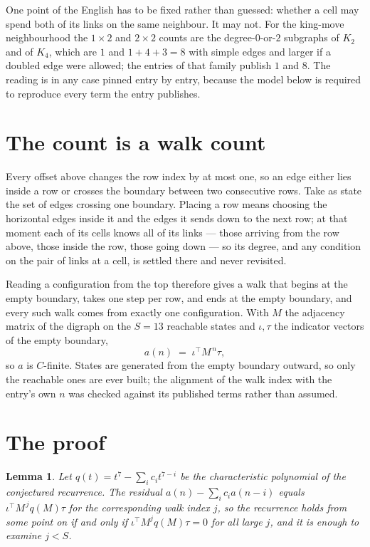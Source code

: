\documentclass[11pt,a4paper]{article}
\theoremstyle{plain}
\newtheorem{lemma}[theorem]{Lemma}
\theoremstyle{definition}
\begin{document}
One point of the English has to be fixed rather than guessed: whether a cell may spend both of
its links on the same neighbour. It may not. For the king-move neighbourhood the $1\times2$
and $2\times2$ counts are the degree-$0$-or-$2$ subgraphs of $K_2$ and of $K_4$, which are $1$
and $1+4+3=8$ with simple edges and larger if a doubled edge were allowed; the entries of that
family publish $1$ and $8$. The reading is in any case pinned entry by entry, because the
model below is required to reproduce every term the entry publishes.


\section{The count is a walk count}

Every offset above changes the row index by at most one, so an edge either lies inside a row
or crosses the boundary between two consecutive rows. Take as state the set of edges crossing
one boundary. Placing a row means choosing the horizontal edges inside it and the edges it
sends down to the next row; at that moment each of its cells knows all of its links --- those
arriving from the row above, those inside the row, those going down --- so its degree, and any
condition on the pair of links at a cell, is settled there and never revisited.

Reading a configuration from the top therefore gives a walk that begins at the empty boundary,
takes one step per row, and ends at the empty boundary, and every such walk comes from exactly
one configuration. With $M$ the adjacency matrix of the digraph on the $S=13$ reachable
states and $\iota,\tau$ the indicator vectors of the empty boundary,
\[
a(n)\;=\;\iota^{\!\top}M^{\,n}\tau ,
\]
so $a$ is $C$-finite. States are generated from the empty boundary outward, so only the
reachable ones are ever built; the alignment of the walk index with the entry's own $n$ was
checked against its published terms rather than assumed.

\section{The proof}

\begin{lemma}\label{lem:crit}
Let $q(t)=t^{7}-\sum_i c_it^{7-i}$ be the characteristic polynomial of the
conjectured recurrence. The residual $a(n)-\sum_ic_ia(n-i)$ equals
$\iota^{\!\top}M^{\,j}q(M)\tau$ for the corresponding walk index $j$, so the recurrence
holds from some point on if and only if $\iota^{\!\top}M^{j}q(M)\tau=0$ for all large $j$,
and it is enough to examine $j<S$.
\end{lemma}
\end{document}
